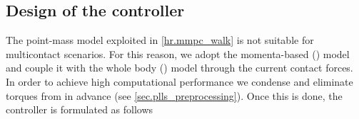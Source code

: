 \FloatBarrier


\subsection{Design of the controller}\label{sec.force_controller}

The point-mass model exploited in \cref{hr.mmpc_walk} is not suitable for
multicontact scenarios. For this reason, we adopt the momenta-based
() model and couple it with the whole body
() model through the current contact forces. In order to
achieve high computational performance we condense  and
eliminate torques from  in advance (see
\cref{sec.plls_preprocessing}). Once this is done, the controller is formulated
as follows
%

